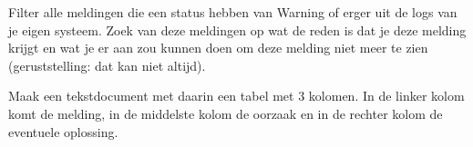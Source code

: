 Filter alle meldingen die een status hebben van Warning of erger uit de logs van je eigen systeem. Zoek van deze meldingen op wat de reden is dat je deze melding krijgt en wat je er aan zou kunnen doen om deze melding niet meer te zien (geruststelling: dat kan niet altijd).

Maak een tekstdocument met daarin een tabel met 3 kolomen. In de linker kolom komt de melding, in de middelste kolom de oorzaak en in de rechter kolom de eventuele oplossing.

